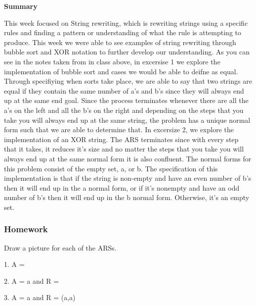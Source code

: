 \documentclass{article}
\theoremstyle{theorem}
\theoremstyle{definition}
\theoremstyle{remark}
\begin{document}
\textbf{Summary}

This week focused on String rewriting, which is rewriting strings using a specific rules and
finding a pattern or understanding of what the rule is attempting to produce. This week we were
able to see examples of string rewriting through bubble sort and XOR notation to further develop 
our understanding. As you can see in the notes taken from in class above, in excersise 1 we explore
the implementation of bubble sort and cases we would be able to deifne as equal. Through specifiying
when sorts take place, we are able to say that two strings are equal if they contain the same number of 
a's and b's since they will always end up at the same end goal. Since the process terminates whenever there 
are all the a's on the left and all the b's on the right and depending on the steps that you take you will 
always end up at the same string, the problem has a unique normal form such that we are able to determine 
that. In excersize 2, we explore the implementation of an XOR string. The ARS terminates since with 
every step that it takes, it reduces it's size and no matter the steps that you take you will always 
end up at the same normal form it is also confluent. The normal forms for this problem consist of the 
empty set, a, or b. The specification of this implementation is that if the string is non-empty and have 
an even number of b's then it will end up in the a normal form, or if it's nonempty and have an odd 
number of b's then it will end up in the b normal form. Otherwise, it's an empty set. 

\subsubsection{Homework}

Draw a picture for each of the ARSs.

1. A = {} \\
\begin{tikzpicture}[->, thick, node distance=2cm]
\end{tikzpicture}

2. A = {a} and R = {} \\

3. A = {a} and R = {(a,a)} \\
\end{document}
